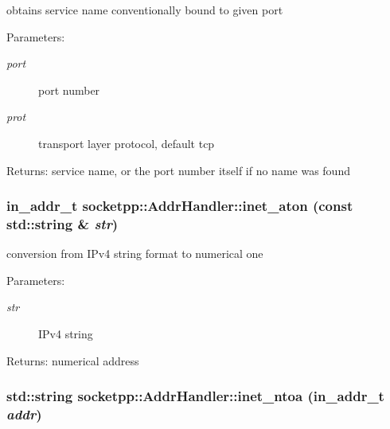 obtains service name conventionally bound to given port 

\begin{Desc}
\item[Parameters:]
\begin{description}
\item[{\em port}]port number \item[{\em prot}]transport layer protocol, default tcp \end{description}
\end{Desc}
\begin{Desc}
\item[Returns:]service name, or the port number itself if no name was found \end{Desc}
\hypertarget{classsocketpp_1_1AddrHandler_e2eda37cd4c20059c557e4e65c829cf8}{
\subsubsection[{inet\_\-aton}]{\setlength{\rightskip}{0pt plus 5cm}in\_\-addr\_\-t socketpp::AddrHandler::inet\_\-aton (const std::string \& {\em str})}}
\label{classsocketpp_1_1AddrHandler_e2eda37cd4c20059c557e4e65c829cf8}


conversion from IPv4 string format to numerical one 

\begin{Desc}
\item[Parameters:]
\begin{description}
\item[{\em str}]IPv4 string \end{description}
\end{Desc}
\begin{Desc}
\item[Returns:]numerical address \end{Desc}
\hypertarget{classsocketpp_1_1AddrHandler_a4377d84c8ea976aeada2b2eb0ac248d}{
\subsubsection[{inet\_\-ntoa}]{\setlength{\rightskip}{0pt plus 5cm}std::string socketpp::AddrHandler::inet\_\-ntoa (in\_\-addr\_\-t {\em addr})}}
\label{classsocketpp_1_1AddrHandler_a4377d84c8ea976aeada2b2eb0ac248d}


